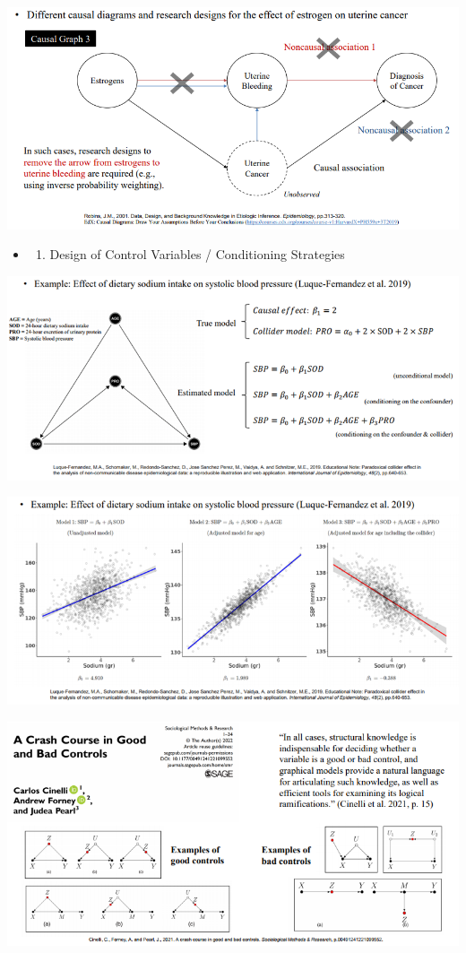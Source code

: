 \documentclass[
]{book}
\providecommand{\tightlist}{%
  \setlength{\itemsep}{0pt}\setlength{\parskip}{0pt}}
\theoremstyle{definition}
\theoremstyle{definition}
\theoremstyle{definition}
\theoremstyle{definition}
\theoremstyle{remark}
\begin{document}
\includegraphics{figures/46.png}

\begin{itemize}
\item
  \begin{enumerate}
  \def\labelenumi{(\arabic{enumi})}
  \setcounter{enumi}{1}
  \tightlist
  \item
    Design of Control Variables / Conditioning Strategies
  \end{enumerate}
\end{itemize}

\includegraphics{figures/47.png}

\includegraphics{figures/48.png}

\includegraphics{figures/49.png}
\end{document}
